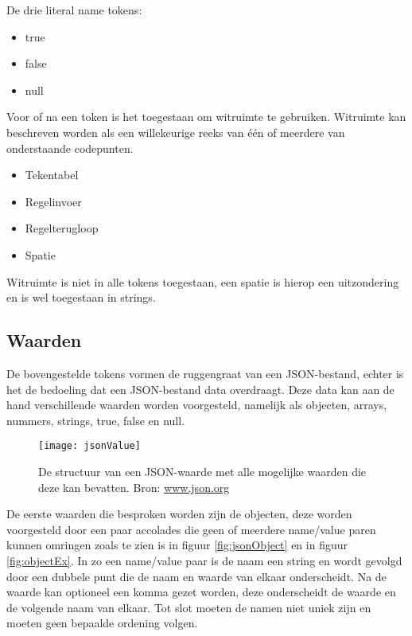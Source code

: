 De drie literal name tokens:

\begin{itemize}
    \item true  
    \item false     
    \item null      
\end{itemize}

Voor of na een token is het toegestaan om witruimte te gebruiken. Witruimte kan beschreven worden als een willekeurige reeks van één of meerdere van onderstaande codepunten.

\begin{itemize}
    \item Tekentabel       
    \item Regelinvoer       
    \item Regelterugloop   
    \item Spatie           
\end{itemize}

Witruimte is niet in alle tokens toegestaan, een spatie is hierop een uitzondering en is wel toegestaan in strings.

\subsection{Waarden}
\label{subsec:Waarden}

De bovengestelde tokens vormen de ruggengraat van een JSON-bestand, echter is het de bedoeling dat een JSON-bestand data overdraagt. Deze data kan aan de hand verschillende waarden worden voorgesteld, namelijk als objecten, arrays, nummers, strings, true, false en null.

\begin{figure}[ht]
    \centering
    \texttt{[image: jsonValue]}
   \caption[JSON values]{De structuur van een JSON-waarde met alle mogelijke waarden die deze kan bevatten. Bron: \url{www.json.org}}
   \label{fig:jsonValue}
\end{figure}

De eerste waarden die besproken worden zijn de objecten, deze worden voorgesteld door een paar accolades die geen of meerdere name/value paren kunnen omringen zoals te zien is in figuur \ref{fig:jsonObject} en in figuur \ref{fig:objectEx}. In zo een name/value paar is de naam een string en wordt gevolgd door een dubbele punt die de naam en waarde van elkaar onderscheidt. Na de waarde kan optioneel een komma gezet worden, deze onderscheidt de waarde en de volgende naam van elkaar. Tot slot moeten de namen niet uniek zijn en moeten geen bepaalde ordening volgen.

